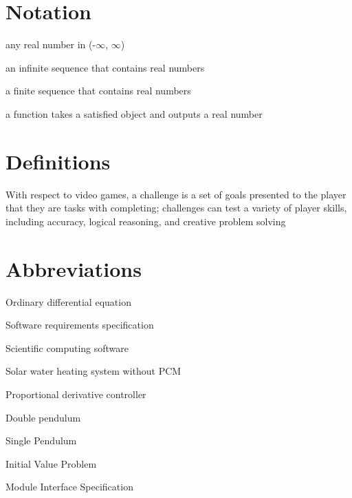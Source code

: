 
\section*{Notation}
\begin{description}[font=\rmfamily\bfseries, leftmargin=3.5cm, style=nextline]
	\item[$\mathbb{R}$] any real number in (-$\infty$, $\infty$)
	\item[$\mathbb{R}^n$] an infinite sequence that contains real numbers
	\item[$\mathbb{R}^k$] a finite sequence that contains real numbers
	\item[$? \rightarrow \mathbb{R}$] a function takes a satisfied object and outputs a real number
\end{description}

\section*{Definitions}
\begin{description}[font=\rmfamily\bfseries, leftmargin=3.5cm, style=nextline]
	\item[Challenge] With respect to video games, a challenge is a set of goals presented to the player that they are tasks with completing; challenges can test a variety of player skills, including accuracy, logical reasoning, and creative problem solving
\end{description}

\section*{Abbreviations}
\begin{description}[font=\rmfamily\bfseries, leftmargin=3.5cm, style=nextline]
	\item[ODE] Ordinary differential equation
	\item[SRS] Software requirements specification
	\item[SCS] Scientific computing software
	\item[NoPCM] Solar water heating system without PCM
	\item[PDController] Proportional derivative controller
	\item[DblPendulum] Double pendulum
	\item[SglPendulum] Single Pendulum
	\item[IVP] Initial Value Problem
	\item[MIS] Module Interface Specification

\end{description}